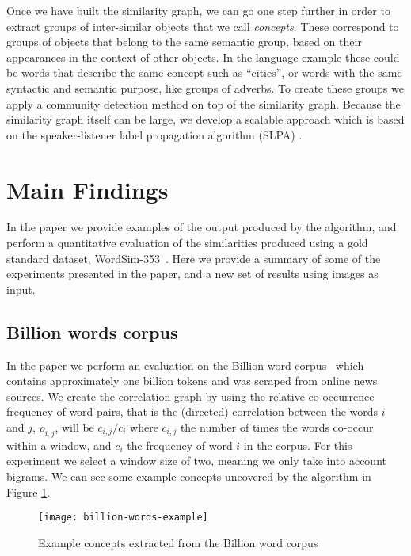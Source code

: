 Once we have built the similarity graph, we can go one step further in order to extract
groups of inter-similar objects that we call \emph{concepts}. These correspond to groups
of objects that belong to the same semantic group, based on their appearances in the context
of other objects. In the language example these could be words that describe the same
concept such as ``cities'', or words with the same syntactic and semantic purpose, like
groups of adverbs. To create these groups we apply a community detection method on top
of the similarity graph. Because the similarity graph itself can be large, we develop
a scalable approach which is based on the speaker-listener label propagation algorithm
(SLPA) \cite{slpa}. 

\section{Main Findings}

\label{sec:concepts-main-findings}

In the paper we provide examples of the output produced by the algorithm, and
perform a quantitative evaluation of the similarities produced using a gold standard dataset,
WordSim-353~\cite{wordsim}. Here we provide a summary of some of the experiments
presented in the paper, and a new set of results using images as input.

\subsection{Billion words corpus}

In the paper we perform an evaluation on the Billion word corpus~\cite{billion-word}
which contains approximately one billion tokens and was scraped from online news
sources. We create the correlation graph by using the relative co-occurrence frequency
of word pairs, that is the (directed) correlation between the words $i$ and $j$, $\rho_{i, j}$,
will be $c_{i,j}/c_i$ where $c_{i,j}$ the number of times the words co-occur within
a window, and $c_i$ the frequency of word $i$ in the corpus. For this experiment we
select a window size of two, meaning we only take into account bigrams.
We can see some example concepts uncovered by the algorithm in Figure \ref{fig:concepts-billion}.

\begin{figure}
	\centering
	\texttt{[image: billion-words-example]}
	\caption{Example concepts extracted from the Billion word corpus}
	\label{fig:concepts-billion}
\end{figure}

